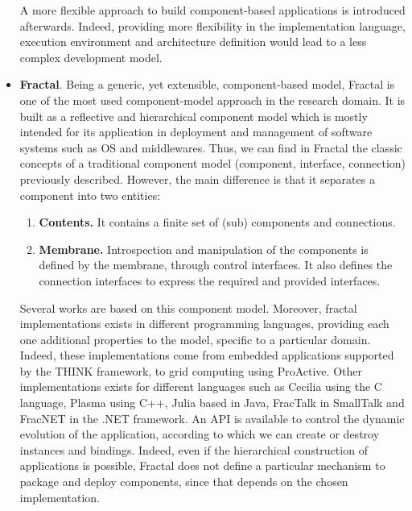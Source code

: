\begin{itemize}
	A more flexible approach to build component-based applications is introduced afterwards.
	Indeed, providing more flexibility in the implementation language, execution environment and architecture definition would lead to a less complex development model.

	\item \textbf{Fractal}.	Being a generic, yet extensible, component-based model, Fractal\cite{bruneton2006fractal} is one of the most used component-model approach in the research domain.
	It is built as a reflective and hierarchical component model which is mostly intended for its application in deployment and management of software systems such as OS and middlewares.
	Thus, we can find in Fractal the classic concepts of a traditional component model (component, interface, connection) previously described.
	However, the main difference is that it separates a component into two entities:
	\begin{enumerate}
		\item \textbf{Contents.} It contains a finite set of (sub) components and connections.
		\item \textbf{Membrane.} Introspection and manipulation of the components is defined by the membrane, through control interfaces.
		It also defines the connection interfaces to express the required and provided interfaces.
	\end{enumerate}

	Several works\cite{david2005wildcat}\cite{bouchenak2006autonomic}\cite{leclercq2004dream}\cite{romero2010restful} are based on this component model.
	Moreover, fractal implementations exists in different programming languages, providing each one additional properties to the model, specific to a particular domain.
	Indeed, these implementations come from embedded applications supported by the THINK framework\cite{fassino2002think}\cite{polakovic2006building}\cite{hoang2008valentine}, to grid computing using ProActive\cite{caromel2006proactive}.
	Other implementations exists for different languages such as Cecilia\cite{cecilia2015} using the C language, Plasma using C++, Julia\cite{bruneton2006fractal} based in Java, FracTalk in SmallTalk and FracNET in the .NET framework.
	An API is available to control the dynamic evolution of the application, according to which we can create or destroy instances and bindings.
	Indeed, even if the hierarchical construction of applications is possible, Fractal does not define a particular mechanism to package and deploy components, since that depends on the chosen implementation.
\end{itemize}

